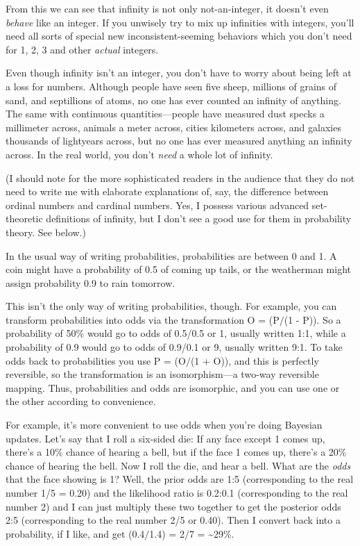 {
 From this we can see that infinity is not only not-an-integer, it
doesn't even \textit{behave} like an integer. If you
unwisely try to mix up infinities with integers, you'll
need all sorts of special new inconsistent-seeming behaviors which you
don't need for 1, 2, 3 and other \textit{actual}
integers.}

{
 Even though infinity isn't an integer, you
don't have to worry about being left at a loss for
numbers. Although people have seen five sheep, millions of grains of
sand, and septillions of atoms, no one has ever counted an infinity of
anything. The same with continuous quantities---people have measured
dust specks a millimeter across, animals a meter across, cities
kilometers across, and galaxies thousands of lightyears across, but no
one has ever measured anything an infinity across. In the real world,
you don't \textit{need} a whole lot of infinity.}

{
 (I should note for the more sophisticated readers in the audience
that they do not need to write me with elaborate explanations of, say,
the difference between ordinal numbers and cardinal numbers. Yes, I
possess various advanced set-theoretic definitions of infinity, but I
don't see a good use for them in probability theory.
See below.)}

{
 In the usual way of writing probabilities, probabilities are
between 0 and 1. A coin might have a probability of 0.5 of coming up
tails, or the weatherman might assign probability 0.9 to rain
tomorrow.}

{
 This isn't the only way of writing probabilities,
though. For example, you can transform probabilities into odds via the
transformation O = (P$/$(1 - P)). So a probability of 50\% would go to
odds of 0.5/0.5 or 1, usually written 1:1, while a probability of 0.9
would go to odds of 0.9/0.1 or 9, usually written 9:1. To take odds
back to probabilities you use P = (O$/$(1 + O)), and this is perfectly
reversible, so the transformation is an isomorphism---a two-way
reversible mapping. Thus, probabilities and odds are isomorphic, and
you can use one or the other according to convenience.}

{
 For example, it's more convenient to use odds when
you're doing Bayesian updates. Let's
say that I roll a six-sided die: If any face except 1 comes up,
there's a 10\% chance of hearing a bell, but if the
face 1 comes up, there's a 20\% chance of hearing the
bell. Now I roll the die, and hear a bell. What are the \textit{odds}
that the face showing is 1? Well, the prior odds are 1:5 (corresponding
to the real number 1/5 = 0.20) and the likelihood ratio is 0.2:0.1
(corresponding to the real number 2) and I can just multiply these two
together to get the posterior odds 2:5 (corresponding to the real
number 2/5 or 0.40). Then I convert back into a probability, if I like,
and get (0.4$/$1.4) = 2$/$7 = \~{}29\%.}


